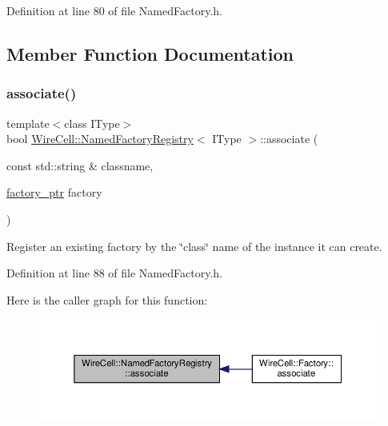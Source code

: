 Definition at line 80 of file Named\+Factory.\+h.



\subsection{Member Function Documentation}
\mbox{\label{class_wire_cell_1_1_named_factory_registry_acde24109a432adf658c5c23f97903251}} 
\subsubsection{\texorpdfstring{associate()}{associate()}}
{\footnotesize\ttfamily template$<$class I\+Type$>$ \\
bool \hyperlink{class_wire_cell_1_1_named_factory_registry}{Wire\+Cell\+::\+Named\+Factory\+Registry}$<$ I\+Type $>$\+::associate (\begin{DoxyParamCaption}\item[{const std\+::string \&}]{classname,  }\item[{\hyperlink{class_wire_cell_1_1_named_factory_registry_a4d693bf86f7a8a24ac7dc00d92d929cf}{factory\+\_\+ptr}}]{factory }\end{DoxyParamCaption})\hspace{0.3cm}{\ttfamily [inline]}}



Register an existing factory by the \char`\"{}class\char`\"{} name of the instance it can create. 



Definition at line 88 of file Named\+Factory.\+h.

Here is the caller graph for this function\+:
\nopagebreak
\begin{figure}[H]
\begin{center}
\leavevmode
\includegraphics[width=350pt]{class_wire_cell_1_1_named_factory_registry_acde24109a432adf658c5c23f97903251_icgraph}
\end{center}
\end{figure}
\mbox{\label{class_wire_cell_1_1_named_factory_registry_ab5844c96704cab954fed1bffb224dc78}} 
